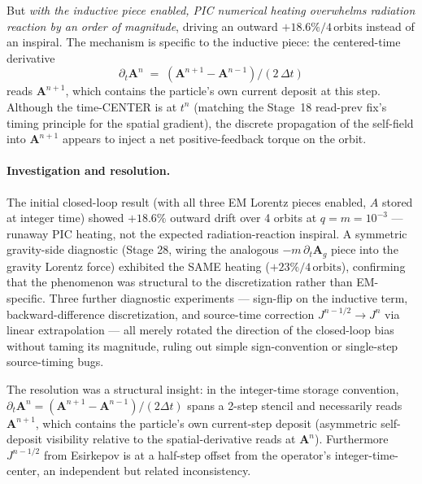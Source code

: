 \documentclass[11pt,a4paper]{article}
\newcommand{\vv}[1]{\mathbf{#1}}
\begin{document}
But \emph{with the inductive piece enabled, PIC numerical heating
overwhelms radiation reaction by an order of magnitude}, driving an
outward $+18.6\%/4\,\mathrm{orbits}$ instead of an inspiral.  The
mechanism is specific to the inductive piece: the centered-time
derivative
\[
  \partial_t\vv{A}^n \;=\; (\vv{A}^{n+1} - \vv{A}^{n-1})/(2\,\Delta t)
\]
reads $\vv{A}^{n+1}$, which contains the particle's own current
deposit at this step.  Although the time-CENTER is at $t^n$ (matching
the Stage~18 read-prev fix's timing principle for the spatial
gradient), the discrete propagation of the self-field into $\vv{A}^{n+1}$
appears to inject a net positive-feedback torque on the orbit.

\paragraph{Investigation and resolution.}  The initial closed-loop
result (with all three EM Lorentz pieces enabled, $A$ stored at integer
time) showed $+18.6\%$ outward drift over 4 orbits at $q = m = 10^{-3}$
--- runaway PIC heating, not the expected radiation-reaction inspiral.
A symmetric gravity-side diagnostic (Stage 28, wiring the analogous
$-m\,\partial_t\vv{A}_g$ piece into the gravity Lorentz force) exhibited
the SAME heating ($+23\%/4\,\mathrm{orbits}$), confirming that the
phenomenon was structural to the discretization rather than EM-specific.
Three further diagnostic experiments --- sign-flip on the inductive
term, backward-difference discretization, and source-time correction
$J^{n-1/2} \to J^n$ via linear extrapolation --- all merely rotated
the direction of the closed-loop bias without taming its magnitude,
ruling out simple sign-convention or single-step source-timing bugs.

The resolution was a structural insight: in the integer-time storage
convention, $\partial_t\vv{A}^n = (\vv{A}^{n+1} - \vv{A}^{n-1})/(2\Delta t)$
spans a 2-step stencil and necessarily reads $\vv{A}^{n+1}$, which
contains the particle's own current-step deposit (asymmetric self-
deposit visibility relative to the spatial-derivative reads at
$\vv{A}^n$).  Furthermore $J^{n-1/2}$ from Esirkepov is at a half-step
offset from the operator's integer-time-center, an independent but
related inconsistency.
\end{document}
